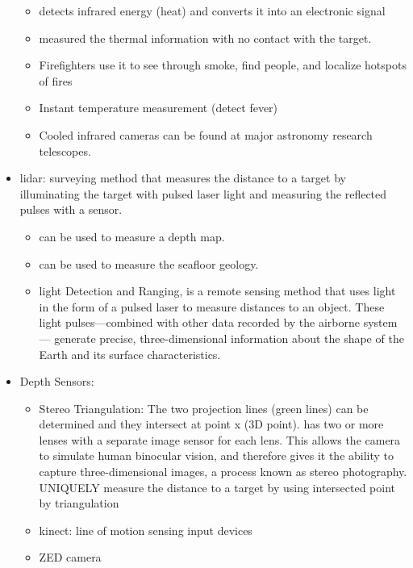 \documentclass[10pt]{article}
\begin{document}
\begin{itemize}[label=\(\star\), leftmargin=1em, itemsep=-0.3em]
\begin{itemize}[label=\(\star\), leftmargin=1em, itemsep=-0.3em]
              \item detects infrared energy (heat) and converts it into an electronic signal
              \item measured the thermal information with no contact with the target.
              \item Firefighters use it to see through smoke, find people, and localize hotspots of fires
              \item Instant temperature measurement (detect fever)
              \item  Cooled infrared cameras can be found at major astronomy research telescopes.
          \end{itemize}
    \item lidar: surveying method that measures the distance to a target by illuminating the target with pulsed laser light and measuring the reflected pulses with a sensor.
          \begin{itemize}[label=\(\star\), leftmargin=1em, itemsep=-0.3em]
              \item can be used to measure a depth map.
              \item  can be used to measure the seafloor geology.
              \item light Detection and Ranging, is a remote sensing method that uses light in the form of a pulsed laser to measure distances to an object. These light pulses—combined with other data recorded by the airborne system— generate precise, three-dimensional information about the shape of the Earth and its surface characteristics.
          \end{itemize}
    \item Depth Sensors:
          \begin{itemize}[label=\(\star\), leftmargin=1em]
              \item Stereo Triangulation: The two projection lines (green lines) can be determined and they intersect at point x (3D point). has two or more lenses with a separate image sensor for each lens. This allows the camera to simulate human binocular vision, and therefore gives it the ability to capture three-dimensional images, a process known as stereo photography. UNIQUELY measure the distance to a target by using  intersected point by triangulation
              \item  kinect: line of motion sensing input devices
              \item ZED camera
          \end{itemize}

\end{itemize}
\end{document}
